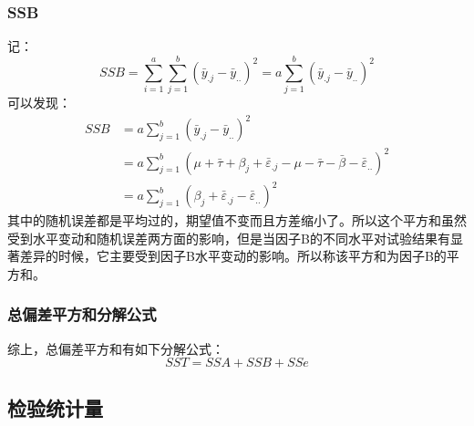 \subsubsection{SSB}
记：
\begin{equation*}
	SSB=\sum_{i=1}^a\sum_{j=1}^b(\bar{y}_{.j}-\bar{y}_{..})^2=a\sum_{j=1}^b(\bar{y}_{.j}-\bar{y}_{..})^2
\end{equation*}
可以发现：
\begin{align*}
	SSB&=a\sum_{j=1}^b(\bar{y}_{.j}-\bar{y}_{..})^2 \\
	&=a\sum_{j=1}^b(\mu+\bar{\tau}+\beta_j+\bar{\varepsilon}_{.j}-\mu-\bar{\tau}-\bar{\beta}-\bar{\varepsilon}_{..})^2 \\
	&=a\sum_{j=1}^b(\beta_j+\bar{\varepsilon}_{.j}-\bar{\varepsilon}_{..})^2
\end{align*}
其中的随机误差都是平均过的，期望值不变而且方差缩小了。所以这个平方和虽然受到水平变动和随机误差两方面的影响，但是当因子B的不同水平对试验结果有显著差异的时候，它主要受到因子B水平变动的影响。所以称该平方和为因子B的平方和。\par
\subsubsection{总偏差平方和分解公式}
综上，总偏差平方和有如下分解公式：
\begin{equation*}
	SST=SSA+SSB+SSe
\end{equation*}

\subsection{检验统计量}
